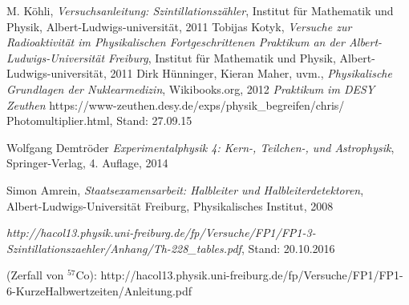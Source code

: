 \documentclass[12pt,listof=totoc]{scrartcl}
\begin{document}
\newpage
\thispagestyle{empty}
\begin{thebibliography}{9}

	M. Köhli,
	\emph{Versuchsanleitung: Szintillationszähler},
	Institut für Mathematik und Physik,
	Albert-Ludwigs-universität,
	2011
	Tobijas Kotyk,
	\emph{Versuche zur Radioaktivität im Physikalischen Fortgeschrittenen Praktikum an der Albert-Ludwigs-Universität Freiburg},
	Institut für Mathematik und Physik,
	Albert-Ludwigs-universität,
	2011
	Dirk Hünninger, Kieran Maher, uvm.,
	\emph{Physikalische Grundlagen der Nuklearmedizin},
	Wikibooks.org,
	2012
	\emph{Praktikum im DESY Zeuthen}
	https://www-zeuthen.desy.de/exps/physik\_begreifen/chris/\\Photomultiplier.html,
	Stand: 27.09.15
	
Wolfgang Demtröder
 \emph{Experimentalphysik 4: Kern-, Teilchen-, und Astrophysik},
 Springer-Verlag,
 4. Auflage,
 2014
 
 Simon Amrein,
 \emph{Staatsexamensarbeit: Halbleiter und Halbleiterdetektoren},\\
 Albert-Ludwigs-Universität Freiburg,
 Physikalisches Institut,
 2008
 
\emph{http://hacol13.physik.uni-freiburg.de/fp/Versuche/FP1/FP1-3-Szintillationszaehler/Anhang/Th-228\_tables.pdf}, Stand: 20.10.2016

(Zerfall von $^{57}$Co): http://hacol13.physik.uni-freiburg.de/fp/Versuche/FP1/FP1-6-KurzeHalbwertzeiten/Anleitung.pdf
\end{thebibliography}
\end{document}
